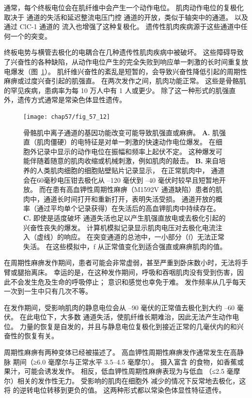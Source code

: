 通常，每个终板电位会在肌纤维中会产生一个动作电位。
肌肉动作电位的复极化取决于  通道的失活和延迟整流电压门控  通道的开放，类似于轴突中的通道。
以及通过 ClC-1  通道的  流入也增强了这种复极化。
遗传性肌肉疾病源于这些通道中任何一个的突变。


终板电势与横管去极化的电耦合在几种遗传性肌肉疾病中被破坏。
这些障碍导致了兴奋性的各种缺陷，从动作电位产生的完全失败到响应单一刺激的长时间重复放电爆发（图~\ref{fig:57_12}）。
肌纤维兴奋性的紊乱是短暂的，会导致兴奋性降低引起的周期性麻痹或过度兴奋引起的肌强直。
在两次发作之间，肌肉功能正常。
这些是骨骼肌的罕见疾病，患病率为每 10 万人中有 1 人或更少。
除了这一种形式的肌强直外，遗传方式通常是常染色体显性遗传。


\begin{figure}[htbp]
	\centering
	\texttt{[image: chap57/fig\_57\_12]}
	\caption{骨骼肌中离子通道的基因功能改变可能导致肌强直或麻痹。
		\textbf{A.} 肌强直（肌肉僵硬）的电特征是对单一刺激的快速动作电位爆发。
		在细胞外记录中显示的动作电位在振幅和频率上起伏不定。
		这种爆发可能伴随着随意的肌肉收缩或机械刺激，例如肌肉的敲击。
		\textbf{B.} 来自培养的人类肌肉细胞的细胞贴壁贴片记录显示，
		在正常肌肉中， 通道会在60毫秒电压钳去极化从 –120 毫伏到 –40 毫伏时较早且短暂地开放。
		而在患有高血钾性周期性麻痹（M1592V  通道缺陷）患者的肌肉中，通道长时间打开和重新打开，表明失活受损。
		通道开放的概率（通过平均单个记录获得）在失活后的高血钾肌肉中持续存在。
		\textbf{C.} 即使是适度破坏  通道失活也足以产生肌强直放电或去极化引起的兴奋性丧失的爆发。
		计算机模拟记录显示肌肉电压对去极化电流注入（虚线）的响应。
		在突变通道的总池中，一小部分（f）无法正常失活。
		在这些模拟中，f 从正常值变化到适合强直或麻痹肌肉的值。}
	\label{fig:57_12}
\end{figure}


在周期性麻痹发作期间，患者可能会非常虚弱，甚至严重到卧床数小时，无法将手臂或腿抬离床。
幸运的是，在这种发作期间，呼吸和吞咽肌肉没有受到伤害，因此不会发生危及生命的呼吸停止；
意识和感觉也幸免于难。
发作频率从几乎每天一次到一生中只有几次不等。


在发作期间，受影响肌肉的静息电位会从 –90 毫伏的正常值去极化到大约 –60 毫伏。
在此电位下，大多数  通道失活，使肌纤维长期难治，因此无法产生动作电位。
力量的恢复是自发的，并且与静息电位复极化到接近正常的几毫伏内的和兴奋性的恢复有关。


周期性麻痹有两种变体已经被描述了。
高血钾性周期性麻痹发作通常发生在高静脉  期间（≥6.0 毫摩尔与正常水平 3.5–4.5 毫摩尔）。
摄入富含  的食物，如香蕉或果汁，可能会诱发发作。
相反，低血钾性周期性麻痹表现为与低血 （≤2.5 毫摩尔）相关的发作性无力。
受影响的肌肉在细胞外  减少的情况下反常地去极化，这将  的逆转电位转移到更负的值。
这两种形式都以常染色体显性特征遗传。


